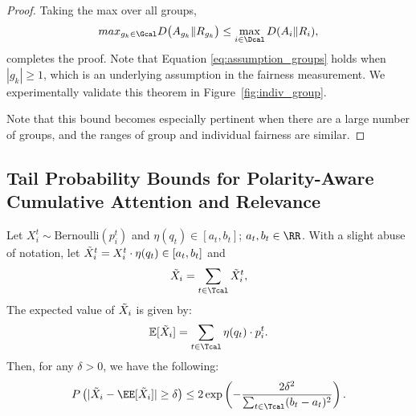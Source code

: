 \begin{proof}
Taking the max over all groups,
\begin{equation}
    max_{g_k \in \Gcal} D\big(A_{g_k} \| R_{g_k}\big) \le \max_{i \in \Dcal} D(A_i \| R_i),
\end{equation}
completes the proof. Note that Equation \ref{eq:assumption_groups} holds when $|g_k| \geq 1$, which is an underlying assumption in the fairness measurement. We experimentally validate this theorem in Figure~\ref{fig:indiv_group}.

Note that this bound becomes especially pertinent when there are a large number of groups, and the ranges of group and individual fairness are similar.  



















\end{proof}








































\subsection{Tail Probability Bounds for Polarity-Aware Cumulative Attention and Relevance}
\begin{theorem}
Let $X_i^t \sim \text{Bernoulli}(p_i^t)$ and $\eta(q_t) \in [a_t, b_t]$; $a_t, b_t \in \RR$. With a slight abuse of notation, let $\Tilde{X}_i^t = X_i^t\cdot \eta(q_t) \in [a_t, b_t]$ and
\[
    \Tilde{X}_i = \sum_{t\in \Tcal} \Tilde{X}_i^t,
\]
The expected value of $\Tilde{X}_i$ is given by:
\[
    \mathbb{E}[\Tilde{X}_i] = \sum_{t\in \Tcal} \eta(q_t) \cdot p_i^t.
\]
Then, for any $\delta > 0$, we have the following:
\[
    P\left(|\Tilde{X}_i - \EE[\Tilde{X}_i]| \geq \delta\right) \leq 2\exp\left(-\frac{2\delta^2}{\sum_{t \in \Tcal} (b_t - a_t)^2}\right).
\]
\end{theorem}

